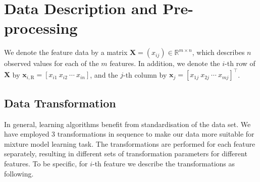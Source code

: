 \section{Data Description and Pre-processing}

We denote the feature data by a matrix $\mathbf{X} = (x_{ij}) \in \mathbb{R}^{m \times n}$, which describes $n$ observed values for each of the $m$ features. In addition, we denote the $i$-th row of $\mathbf{X}$ by $\mathbf{x}_{i,\text{R}} = [x_{i1} ~x_{i2} ~\cdots ~x_{in}]$, and the $j$-th column by $\mathbf{x}_j = [x_{1j} ~x_{2j} ~\cdots ~x_{mj}]^\top$.

\subsection{Data Transformation}

In general, learning algorithms benefit from standardisation of the data set. We have employed 3 transformations in sequence to make our data more suitable for mixture model learning task. The transformations are performed for each feature separately, resulting in different sets of transformation parameters for different features. To be specific, for $i$-th feature we describe the transformations as following.

